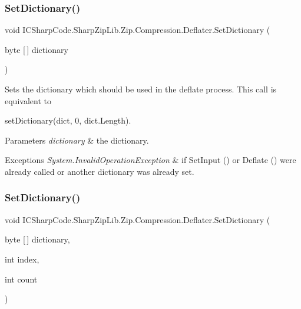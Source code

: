 \subsubsection{\texorpdfstring{Set\+Dictionary()}{SetDictionary()}\hspace{0.1cm}{\footnotesize\ttfamily [3/4]}}
{\footnotesize\ttfamily void I\+C\+Sharp\+Code.\+Sharp\+Zip\+Lib.\+Zip.\+Compression.\+Deflater.\+Set\+Dictionary (\begin{DoxyParamCaption}\item[{byte \mbox{[}$\,$\mbox{]}}]{dictionary }\end{DoxyParamCaption})\hspace{0.3cm}{\ttfamily [inline]}}



Sets the dictionary which should be used in the deflate process. This call is equivalent to 

{\ttfamily set\+Dictionary(dict, 0, dict.\+Length)}. 


\begin{DoxyParams}{Parameters}
{\em dictionary} & the dictionary. \\
\hline
\end{DoxyParams}

\begin{DoxyExceptions}{Exceptions}
{\em System.\+Invalid\+Operation\+Exception} & if Set\+Input () or Deflate () were already called or another dictionary was already set. \\
\hline
\end{DoxyExceptions}
\mbox{\label{class_i_c_sharp_code_1_1_sharp_zip_lib_1_1_zip_1_1_compression_1_1_deflater_a32ef3ee267c15d7a292d6e992c435160}} 
\subsubsection{\texorpdfstring{Set\+Dictionary()}{SetDictionary()}\hspace{0.1cm}{\footnotesize\ttfamily [4/4]}}
{\footnotesize\ttfamily void I\+C\+Sharp\+Code.\+Sharp\+Zip\+Lib.\+Zip.\+Compression.\+Deflater.\+Set\+Dictionary (\begin{DoxyParamCaption}\item[{byte \mbox{[}$\,$\mbox{]}}]{dictionary,  }\item[{int}]{index,  }\item[{int}]{count }\end{DoxyParamCaption})\hspace{0.3cm}{\ttfamily [inline]}}



